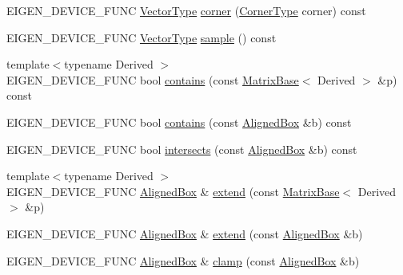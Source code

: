 \begin{DoxyCompactItemize}
\item 
E\+I\+G\+E\+N\+\_\+\+D\+E\+V\+I\+C\+E\+\_\+\+F\+U\+NC \mbox{\hyperlink{class_eigen_1_1_matrix}{Vector\+Type}} \mbox{\hyperlink{class_eigen_1_1_aligned_box_a32e631ff4bfb088e664f696034e63100}{corner}} (\mbox{\hyperlink{class_eigen_1_1_aligned_box_ae4aa935b36004fffc49c7a3a85e2d378}{Corner\+Type}} corner) const
\item 
E\+I\+G\+E\+N\+\_\+\+D\+E\+V\+I\+C\+E\+\_\+\+F\+U\+NC \mbox{\hyperlink{class_eigen_1_1_matrix}{Vector\+Type}} \mbox{\hyperlink{class_eigen_1_1_aligned_box_a3cd54685b5378b5e77fa2c62ca7e2797}{sample}} () const
\item 
{\footnotesize template$<$typename Derived $>$ }\\E\+I\+G\+E\+N\+\_\+\+D\+E\+V\+I\+C\+E\+\_\+\+F\+U\+NC bool \mbox{\hyperlink{class_eigen_1_1_aligned_box_a1882f21e5e56c877ea35505644ef5833}{contains}} (const \mbox{\hyperlink{class_eigen_1_1_matrix_base}{Matrix\+Base}}$<$ Derived $>$ \&p) const
\item 
E\+I\+G\+E\+N\+\_\+\+D\+E\+V\+I\+C\+E\+\_\+\+F\+U\+NC bool \mbox{\hyperlink{class_eigen_1_1_aligned_box_aadae71332cb6be09f93150edb1b6f99a}{contains}} (const \mbox{\hyperlink{class_eigen_1_1_aligned_box}{Aligned\+Box}} \&b) const
\item 
E\+I\+G\+E\+N\+\_\+\+D\+E\+V\+I\+C\+E\+\_\+\+F\+U\+NC bool \mbox{\hyperlink{class_eigen_1_1_aligned_box_a75a5af80f40892bfa267c0245f0d4d12}{intersects}} (const \mbox{\hyperlink{class_eigen_1_1_aligned_box}{Aligned\+Box}} \&b) const
\item 
{\footnotesize template$<$typename Derived $>$ }\\E\+I\+G\+E\+N\+\_\+\+D\+E\+V\+I\+C\+E\+\_\+\+F\+U\+NC \mbox{\hyperlink{class_eigen_1_1_aligned_box}{Aligned\+Box}} \& \mbox{\hyperlink{class_eigen_1_1_aligned_box_a6dfe79aa0435d6db3ed06b0e3b9f79b6}{extend}} (const \mbox{\hyperlink{class_eigen_1_1_matrix_base}{Matrix\+Base}}$<$ Derived $>$ \&p)
\item 
E\+I\+G\+E\+N\+\_\+\+D\+E\+V\+I\+C\+E\+\_\+\+F\+U\+NC \mbox{\hyperlink{class_eigen_1_1_aligned_box}{Aligned\+Box}} \& \mbox{\hyperlink{class_eigen_1_1_aligned_box_ace56bb9d36d9b3e15fb50df80272ed77}{extend}} (const \mbox{\hyperlink{class_eigen_1_1_aligned_box}{Aligned\+Box}} \&b)
\item 
E\+I\+G\+E\+N\+\_\+\+D\+E\+V\+I\+C\+E\+\_\+\+F\+U\+NC \mbox{\hyperlink{class_eigen_1_1_aligned_box}{Aligned\+Box}} \& \mbox{\hyperlink{class_eigen_1_1_aligned_box_a7df756eb446280c7d738ac5ce73d4032}{clamp}} (const \mbox{\hyperlink{class_eigen_1_1_aligned_box}{Aligned\+Box}} \&b)

\end{DoxyCompactItemize}
